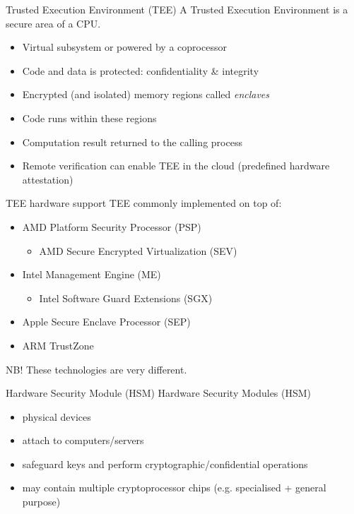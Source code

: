 \begin{frame}{Trusted Execution Environment (TEE)}
  A Trusted Execution Environment is a secure area of a CPU.
  \begin{itemize}[<+(1)->]
    \item Virtual subsystem or powered by a coprocessor
    \item Code and data is protected: confidentiality \& integrity
    \item Encrypted (and isolated) memory regions called \emph{enclaves}
    \item Code runs within these regions
    \item Computation result returned to the calling process
    \item Remote verification can enable TEE in the cloud (predefined hardware attestation)
  \end{itemize}  
\end{frame}

\begin{frame}{TEE hardware support}
  TEE commonly implemented on top of:
  \begin{itemize}[<+(1)->]
    \item AMD Platform Security Processor (PSP) 
    \begin{itemize}
      \item AMD Secure Encrypted Virtualization (SEV)
    \end{itemize}
    \item Intel Management Engine (ME)
    \begin{itemize}
      \item Intel Software Guard Extensions (SGX)
    \end{itemize}
    \item Apple Secure Enclave Processor (SEP)
    \item ARM TrustZone
  \end{itemize}

  \vspace*{1em}
  
  \pause
  NB! These technologies are very different.
\end{frame}

\begin{frame}{Hardware Security Module (HSM)}
  Hardware Security Modules (HSM)
  \begin{itemize}[<+(1)->]
    \item physical devices
    \item attach to computers/servers
    \item safeguard keys and perform cryptographic/confidential operations
    \item may contain multiple cryptoprocessor chips (e.g. specialised + general purpose)
  \end{itemize}
\end{frame}

